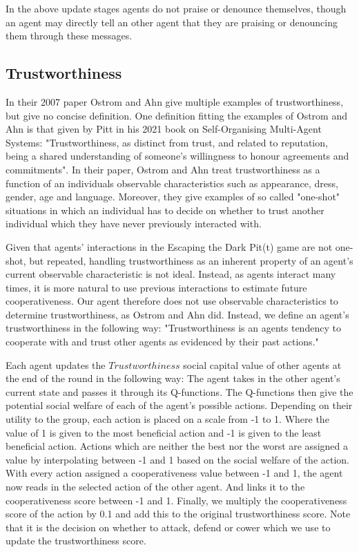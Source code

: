 In the above update stages agents do not praise or denounce themselves, though an agent may directly tell an other agent that they are praising or denouncing them through these messages.


\subsection{Trustworthiness}

In their 2007 paper Ostrom and Ahn give multiple examples of trustworthiness, but give no concise definition. One definition fitting the examples of Ostrom and Ahn is that given by Pitt in his 2021 book on Self-Organising Multi-Agent Systems: "Trustworthiness, as distinct from trust, and related to reputation, being a shared understanding of someone’s willingness to honour agreements and commitments"\cite{pitt}. In their paper, Ostrom and Ahn treat trustworthiness as a function of an individuals observable characteristics such as appearance, dress, gender, age and language. Moreover, they give examples of so called "one-shot" situations in which an individual has to decide on whether to trust another individual which they have never previously interacted with.\cite{ostrom-ahn}

Given that agents' interactions in the Escaping the Dark Pit(t) game are not one-shot, but repeated, handling trustworthiness as an inherent property of an agent's current observable characteristic is not ideal. Instead, as agents interact many times, it is more natural to use previous interactions to estimate future cooperativeness. Our agent therefore does not use observable characteristics to determine trustworthiness, as Ostrom and Ahn did. Instead, we define an agent's trustworthiness in the following way: "Trustworthiness is an agents tendency to cooperate with and trust other agents as evidenced by their past actions."

Each agent updates the $Trustworthiness$ social capital value of other agents at the end of the round in the following way: The agent takes in the other agent's current state and passes it through its Q-functions. The Q-functions then give the potential social welfare of each of the agent's possible actions. Depending on their utility to the group, each action is placed on a scale from -1 to 1. Where the value of 1 is given to the most beneficial action and -1 is given to the least beneficial action. Actions which are neither the best nor the worst are assigned a value by interpolating between -1 and 1 based on the social welfare of the action. With every action assigned a cooperativeness value between -1 and 1, the agent now reads in the selected action of the other agent. And links it to the cooperativeness score between -1 and 1. Finally, we multiply the cooperativeness score of the action by 0.1 and add this to the original trustworthiness score. Note that it is the decision on whether to attack, defend or cower which we use to update the trustworthiness score.

